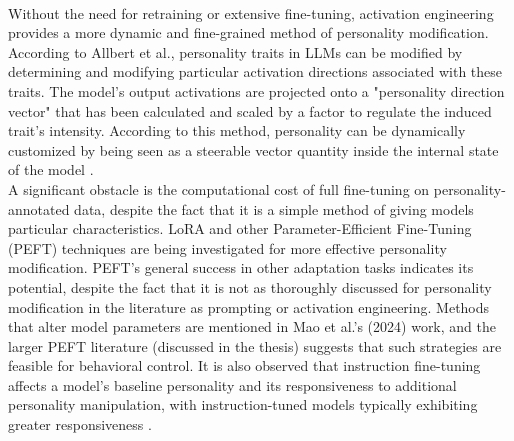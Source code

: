 \documentclass{DESSThesis}
\begin{document}
\\
Without the need for retraining or extensive fine-tuning, activation engineering provides a more dynamic and fine-grained method of personality modification. According to Allbert et al., personality traits in LLMs can be modified by determining and modifying particular activation directions associated with these traits. The model's output activations are projected onto a "personality direction vector" that has been calculated and scaled by a factor to regulate the induced trait's intensity. According to this method, personality can be dynamically customized by being seen as a steerable vector quantity inside the internal state of the model \cite{allbert_identifying_2025}.
\\
A significant obstacle is the computational cost of full fine-tuning on personality-annotated data, despite the fact that it is a simple method of giving models particular characteristics. LoRA and other Parameter-Efficient Fine-Tuning (PEFT) techniques are being investigated for more effective personality modification. PEFT's general success in other adaptation tasks indicates its potential, despite the fact that it is not as thoroughly discussed for personality modification in the literature as prompting or activation engineering. Methods that alter model parameters are mentioned in Mao et al.'s (2024) work, and the larger PEFT literature (discussed in the thesis) suggests that such strategies are feasible for behavioral control. It is also observed that instruction fine-tuning affects a model's baseline personality and its responsiveness to additional personality manipulation, with instruction-tuned models typically exhibiting greater responsiveness \cite{pan_llms_2023,safdari_personality_2023}.
\end{document}
